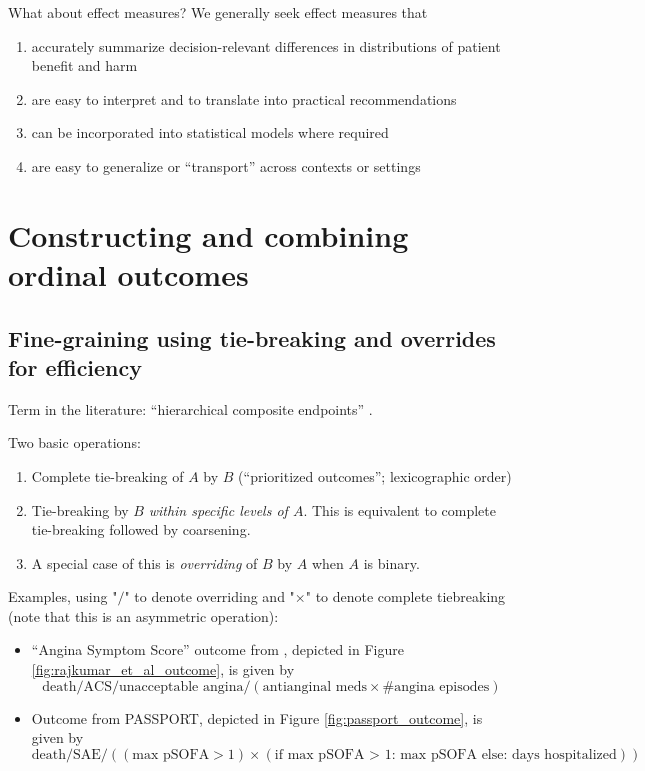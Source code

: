 \documentclass[
  11pt,
  fleqn
]{article}
\begin{document}
What about effect measures? We generally seek effect measures that
\begin{enumerate}
  \item accurately summarize decision-relevant differences in distributions of
    patient benefit and harm
  \item are easy to interpret and to translate into practical recommendations
  \item can be incorporated into statistical models where required
  \item are easy to generalize or ``transport'' across contexts or settings
\end{enumerate}

\section{Constructing and combining ordinal outcomes}

\subsection{Fine-graining using tie-breaking and overrides for efficiency}

Term in the literature: ``hierarchical composite endpoints''
\citep{gasparyanDesignAnalysisStudies2022}.

Two basic operations:
\begin{enumerate}
  \item Complete tie-breaking of $A$ by
    $B$ (``prioritized outcomes''; lexicographic order)
  \item Tie-breaking by $B$
    \emph{within specific levels of $A$}. This is equivalent to complete
    tie-breaking followed by coarsening.
  \item A special case of this is
    \emph{overriding} of $B$ by $A$ when $A$ is binary.
\end{enumerate}

Examples, using "$/$" to denote overriding and "$\times$" to denote complete
tiebreaking (note that this is an asymmetric operation):
\begin{itemize}
  \item
    ``Angina Symptom Score'' outcome from
    \citet{rajkumarPlaceboControlledTrialPercutaneous2023}, depicted in Figure
    \ref{fig:rajkumar_et_al_outcome}, is given by \[ \text{death} / \text{ACS} /
      \text{unacceptable angina} / (\text{antianginal meds} \times
        \text{\# angina
    episodes}) \]
  \item Outcome from PASSPORT, depicted in Figure
    \ref{fig:passport_outcome}, is given by \[ \text{death} / \text{SAE} /
      ((\text{max pSOFA} > 1) \times (\text{if max pSOFA > 1: max
            pSOFA else: days
    hospitalized})) \]
\end{itemize}
\end{document}
